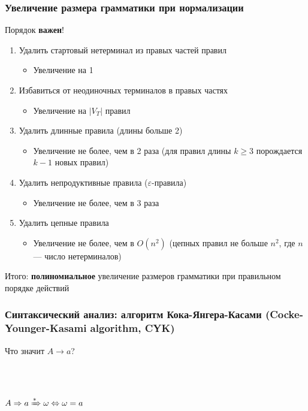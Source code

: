 \documentclass{beamer}
\newcommand{\derive}[0]{\xRightarrow[]{*}}
\begin{document}
\begin{frame}[fragile]
  \transwipe[direction=90]
  \frametitle{Увеличение размера грамматики при нормализации}      
  Порядок \textbf{важен}!
  
  \begin{enumerate}
    \item Удалить стартовый нетерминал из правых частей правил 
    \begin{itemize}
      \item Увеличение на 1
    \end{itemize}
    \item Избавиться от неодиночных терминалов в правых частях 
    \begin{itemize}
      \item Увеличение на $|V_T|$ правил
    \end{itemize}
    \item Удалить длинные правила (длины больше 2)
    \begin{itemize}
      \item Увеличение не более, чем в 2 раза (для правил длины $k \geq 3$ порождается $k-1$ новых правил)
    \end{itemize}
    \item Удалить непродуктивные правила ($\varepsilon$-правила)
    \begin{itemize}
      \item Увеличение не более, чем в 3 раза
    \end{itemize}
    \item Удалить цепные правила
    \begin{itemize}
      \item Увеличение не более, чем в $O(n^2)$ (цепных правил не больше $n^2$, где $n$ --- число нетерминалов)
    \end{itemize}
  \end{enumerate}
  
  Итого: \textbf{полиномиальное} увеличение размеров грамматики при правильном порядке действий
\end{frame}

\begin{frame}[fragile]
  \transwipe[direction=90]
  \frametitle{Синтаксический анализ: алгоритм Кока-Янгера-Касами (Cocke-Younger-Kasami algorithm, CYK)}
  Что значит $A \rightarrow a$? \pause
  
  ~\\~
  
 $A \Rightarrow a  \derive \omega \Leftrightarrow \omega = a$ 
\end{frame}
\end{document}
